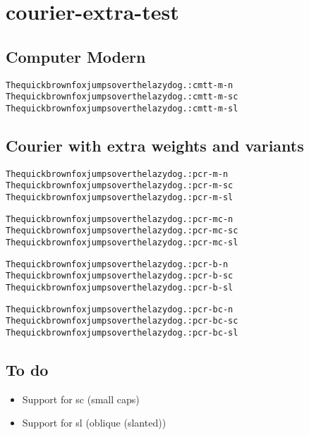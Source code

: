 \documentclass{article}
\newcommand{\quickbrownfox}{The quick brown fox jumps over the lazy dog.}
\begin{document}
\section{courier-extra-test}

\subsection{Computer Modern}

\begin{alltt}
\quickbrownfox{} : cmtt-m-n
\quickbrownfox{} : cmtt-m-sc
\quickbrownfox{} : cmtt-m-sl
\end{alltt}

\subsection{Courier with extra weights and variants}

\begin{alltt}
\quickbrownfox{} : pcr-m-n
\quickbrownfox{} : pcr-m-sc
\quickbrownfox{} : pcr-m-sl

\quickbrownfox{} : pcr-mc-n
\quickbrownfox{} : pcr-mc-sc
\quickbrownfox{} : pcr-mc-sl

\quickbrownfox{} : pcr-b-n
\quickbrownfox{} : pcr-b-sc
\quickbrownfox{} : pcr-b-sl

\quickbrownfox{} : pcr-bc-n
\quickbrownfox{} : pcr-bc-sc
\quickbrownfox{} : pcr-bc-sl
\end{alltt}

\subsection{To do}
\begin{itemize}
  \item Support for sc (small caps)
  \item Support for sl (oblique (slanted))
\end{itemize}
\end{document}
